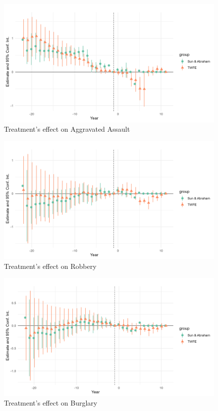 \documentclass{article}
\begin{document}
\begin{figure}[H]
    \begin{center}
        \includegraphics[width=.85\textwidth]{figures/figure3.png}
    \end{center}
    \caption{Treatment's effect on Aggravated Assault}
    \label{fig:graph}
\end{figure}

\begin{figure}[H]
    \begin{center}
        \includegraphics[width=.85\textwidth]{figures/figure4.png}
    \end{center}
    \caption{Treatment's effect on Robbery}
    \label{fig:graph}
\end{figure}

\begin{figure}[H]
    \begin{center}
        \includegraphics[width=.85\textwidth]{figures/figure5.png}
    \end{center}
    \caption{Treatment's effect on Burglary}
    \label{fig:graph}
\end{figure}
\end{document}
